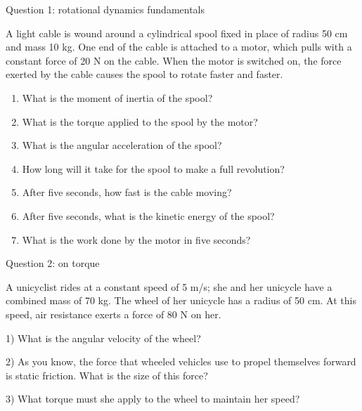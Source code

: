\documentclass[12pt]{article}
\begin{document}
\Large
\centerline{}
\normalsize
\centerline{}

\centerline{\large Question 1: rotational dynamics fundamentals}

\vspace{1in}

  A light cable is wound around a cylindrical spool fixed in place of radius 50 cm and mass 10 kg. One end of the cable is attached to a motor, which pulls with a constant force of 20 N on the cable. When the motor is switched on, the force exerted by the cable causes the spool to rotate faster and faster.
\begin{enumerate}
      \item{What is the moment of inertia of the spool?}
\vspace{0.7in}
      \item{What is the torque applied to the spool by the motor?}
\vspace{0.7in}
      \item{What is the angular acceleration of the spool?}
\vspace{0.7in}
      \item{How long will it take for the spool to make a full revolution?}
\vspace{0.7in}
      \item{After five seconds, how fast is the cable moving?}
\vspace{0.7in}
      \item{After five seconds, what is the kinetic energy of the spool?}
\vspace{0.7in}
      \item{What is the work done by the motor in five seconds?}
     \end{enumerate}
\newpage

\centerline{\large Question 2: on torque}

 A unicyclist rides at a constant speed of 5 m/s; she and her unicycle have a combined mass of 70 kg. The wheel of her unicycle has a radius of 50 cm. At this speed, air resistance exerts a force of 80 N on her.


       1) What is the angular velocity of the wheel?
\vspace{1.2in}

       2) As you know, the force that wheeled vehicles use to propel themselves forward is static friction. What is the size of this force?
\vspace {1.2in}

       3) What torque must she apply to the wheel to maintain her speed?
\vspace{2in}
\end{document}

